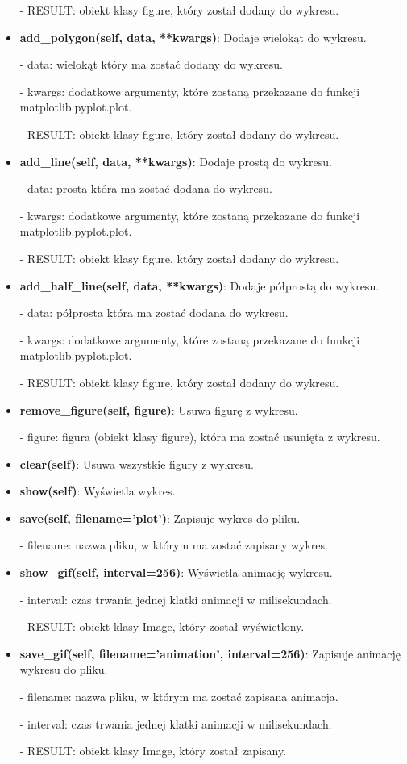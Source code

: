 \documentclass{lab}
\begin{document}
\begin{itemize}
  - RESULT: obiekt klasy figure, który został dodany do wykresu.

  \item \textbf{add\_polygon(self, data, **kwargs)}:
  Dodaje wielokąt do wykresu.

  - data: wielokąt który ma zostać dodany do wykresu.

  - kwargs: dodatkowe argumenty, które zostaną przekazane do funkcji matplotlib.pyplot.plot.

  - RESULT: obiekt klasy figure, który został dodany do wykresu.

  \item \textbf{add\_line(self, data, **kwargs)}:
  Dodaje prostą do wykresu.

  - data: prosta która ma zostać dodana do wykresu.

  - kwargs: dodatkowe argumenty, które zostaną przekazane do funkcji matplotlib.pyplot.plot.

  - RESULT: obiekt klasy figure, który został dodany do wykresu.

  \item \textbf{add\_half\_line(self, data, **kwargs)}:
  Dodaje półprostą do wykresu.

  - data: półprosta która ma zostać dodana do wykresu.

  - kwargs: dodatkowe argumenty, które zostaną przekazane do funkcji matplotlib.pyplot.plot.

  - RESULT: obiekt klasy figure, który został dodany do wykresu.

  \item \textbf{remove\_figure(self, figure)}:
  Usuwa figurę z wykresu.
  
  - figure: figura (obiekt klasy figure), która ma zostać usunięta z wykresu.

  \item \textbf{clear(self)}:
  Usuwa wszystkie figury z wykresu.

  \item \textbf{show(self)}:
  Wyświetla wykres.

  \item \textbf{save(self, filename='plot')}:
  Zapisuje wykres do pliku.

  - filename: nazwa pliku, w którym ma zostać zapisany wykres.

  \item \textbf{show\_gif(self, interval=256)}:
  Wyświetla animację wykresu.

  - interval: czas trwania jednej klatki animacji w milisekundach.

  - RESULT: obiekt klasy Image, który został wyświetlony.

  \item \textbf{save\_gif(self, filename='animation', interval=256)}:
  Zapisuje animację wykresu do pliku.

  - filename: nazwa pliku, w którym ma zostać zapisana animacja.

  - interval: czas trwania jednej klatki animacji w milisekundach.

  - RESULT: obiekt klasy Image, który został zapisany.
\end{itemize}
\end{document}

